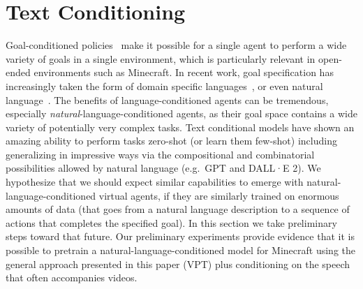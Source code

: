 \section{Text Conditioning}
\label{appendix:text_conditioning}

Goal-conditioned policies~\cite{andrychowicz2017hindsight,schaul2015universal} make it possible for a single agent to perform a wide variety of goals in a single environment, which is particularly relevant in open-ended environments such as Minecraft. In recent work, goal specification has increasingly taken the form of domain specific languages~\cite{team2021open}, or even natural language~\cite{luketina2019survey,team2021creating}. The benefits of language-conditioned agents can be tremendous, especially \emph{natural}-language-conditioned agents, as their goal space contains a wide variety of potentially very complex tasks. Text conditional models have shown an amazing ability to perform tasks zero-shot (or learn them few-shot) including generalizing in impressive ways via the compositional and combinatorial possibilities allowed by natural language (e.g.\ GPT\cite{brown2020language} and DALL·E 2\cite{ramesh2022hierarchical}). We hypothesize that we should expect similar capabilities to emerge with natural-language-conditioned virtual agents, if they are similarly trained on enormous amounts of data (that goes from a natural language description to a sequence of actions that completes the specified goal). In this section we take preliminary steps toward that future. Our preliminary experiments provide evidence that it is possible to pretrain a natural-language-conditioned model for Minecraft using the general approach presented in this paper (VPT) plus conditioning on the speech that often accompanies videos.


